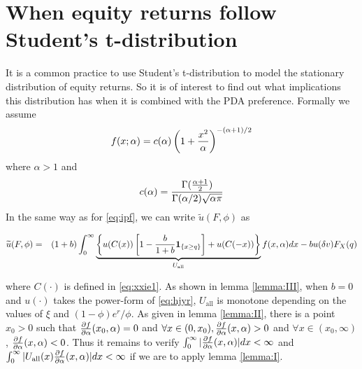 \documentclass[11pt,a4]{amsart}
\newcommand{\pd}{\partial}
\newcommand{\wt}{\widetilde}
\newcommand{\1}{{\mathbf 1}}
\begin{document}
\section{When equity returns follow Student's t-distribution}
\setcounter{equation}{0}
It is a common practice to use Student's t-distribution to model the
stationary distribution of equity returns. So it is of interest to
find out what implications this distribution has when it is combined
with the PDA preference. Formally we assume
\[
f(x; \alpha) = c(\alpha) \left(
  1 + {x^2 \over \alpha}
\right)^{-(\alpha + 1)/2}
\]
where $\alpha > 1$ and
\[
c(\alpha) = {
  \Gamma({\alpha + 1 \over 2})
  \over
  \Gamma(\alpha/2) \sqrt{\alpha \pi}
}
\]
In the same way as for \eqref{eq:ipf}, we can write $\wt u(F, \phi)$
as
\begin{small}
  \begin{eqnarray}
    \wt u(F, \phi)
    &=&
    (1 + b)
    \int_{0}^{\infty}
    \underbrace{
      \left\{
      u(C(x)) \left[
        1 - {b \over 1 + b}\1_{\{x \ge q\}}
        \right]
      + u(C(-x))
      \right\}
    }_{U_{\text{all}}}
    f(x, \alpha) dx - b u(\delta v) F_X(q)
    \label{eq:t1}
  \end{eqnarray}
\end{small}
where $C(\cdot)$ is defined in \eqref{eq:xxie1}. As shown in lemma
\ref{lemma:III}, when $b = 0$ and $u(\cdot)$
takes the power-form of \eqref{eq:hjyr}, $U_{\text{all}}$ is monotone
depending on the values of $\xi$ and $(1 - \phi) e^r / \phi$. As given
in lemma \ref{lemma:II}, there is a point $x_0 > 0$ such that
${\pd f \over \pd \alpha}(x_0, \alpha) = 0$ and
$\forall x \in (0, x_0),
{\pd f \over  \pd \alpha}(x, \alpha) > 0$ and
$\forall x \in (x_0, \infty)$,
${\pd f \over \pd \alpha}(x, \alpha) < 0$. Thus it remains to verify
$\int_0^\infty |{\pd f \over \pd \alpha}(x, \alpha)| dx < \infty$ and
$\int_0^\infty |U_{\text{all}}(x){\pd f \over \pd \alpha}(x, \alpha)| dx < \infty$
if we are to apply lemma \ref{lemma:I}.
\end{document}
